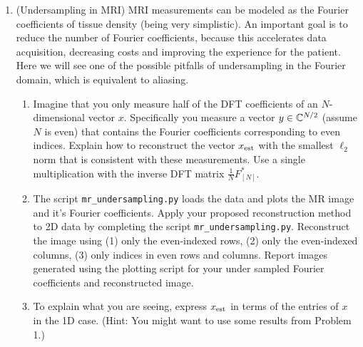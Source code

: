 \documentclass[12pt,twoside]{article}
\begin{document}
\begin{enumerate}
  \newpage
  \item (Undersampling in MRI) MRI measurements can be modeled as the Fourier coefficients of tissue density (being very simplistic). An important goal is to reduce the number of Fourier coefficients, because this accelerates data acquisition, decreasing costs and improving the experience for the patient. Here we will see one of the possible pitfalls of undersampling in the Fourier domain, which is equivalent to aliasing.
 \begin{enumerate}
 \item Imagine that you only measure half of the DFT coefficients of an $N$-dimensional vector $x$.  Specifically you measure a vector $y \in \mathbb{C}^{N/2}$ (assume $N$ is even) that contains the Fourier coefficients corresponding to even indices. Explain how to reconstruct the vector $x_{\operatorname{est}}$ with the smallest $\ell_2$ norm that is consistent with these measurements. Use a single multiplication with the inverse DFT matrix $\frac{1}{N}F_{[N]}^{\ast}$.
 \item The script  \texttt{mr\_undersampling.py} loads the data and plots the MR image and it's Fourier coefficients. Apply your proposed reconstruction method to 2D data by completing the script \texttt{mr\_undersampling.py}.  Reconstruct the image using (1) only the even-indexed rows, (2) only the even-indexed columns, (3) only indices in even rows and columns. Report images generated using the plotting script for your under sampled Fourier coefficients and reconstructed image.  
  \item To explain what you are seeing, express $x_{\operatorname{est}}$ in terms of the entries of $x$ in the 1D case. (Hint: You might want to use some results from Problem 1.)
  \end{enumerate}

 \end{enumerate}
\end{document}
